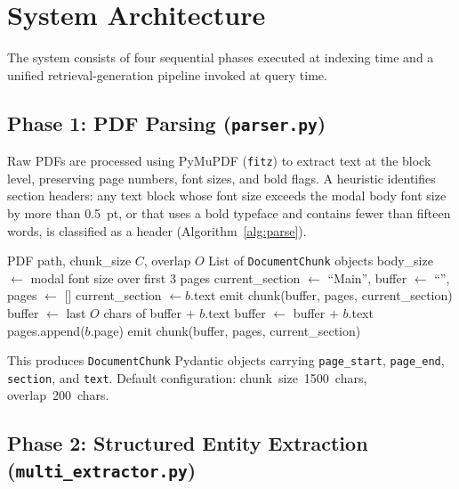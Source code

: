 \documentclass[conference]{IEEEtran}
\begin{document}
\section{System Architecture}
\label{sec:system}

The system consists of four sequential phases executed at indexing time
and a unified retrieval-generation pipeline invoked at query time.

\subsection{Phase 1: PDF Parsing (\texttt{parser.py})}
\label{sec:parsing}

Raw PDFs are processed using PyMuPDF (\texttt{fitz}) to extract text at
the block level, preserving page numbers, font sizes, and bold flags. A
heuristic identifies section headers: any text block whose font size
exceeds the modal body font size by more than 0.5~pt, or that uses a
bold typeface and contains fewer than fifteen words, is classified as a
header (Algorithm~\ref{alg:parse}).

\begin{algorithm}
\caption{Section-Aware Chunking}
\label{alg:parse}
\begin{algorithmic}[1]
\Require PDF path, chunk\_size $C$, overlap $O$
\Ensure List of \texttt{DocumentChunk} objects
\State body\_size $\leftarrow$ modal font size over first 3 pages
\State current\_section $\leftarrow$ ``Main'', buffer $\leftarrow$ ``'', pages $\leftarrow$ []
    \State current\_section $\leftarrow b$.text
  \EndIf
    \State emit chunk(buffer, pages, current\_section)
    \State buffer $\leftarrow$ last $O$ chars of buffer $+$ $b$.text
  \Else
    \State buffer $\leftarrow$ buffer $+$ $b$.text
  \EndIf
  \State pages.append($b$.page)
\EndFor
\State emit chunk(buffer, pages, current\_section)
\end{algorithmic}
\end{algorithm}

This produces \texttt{DocumentChunk} Pydantic objects carrying
\texttt{page\_start}, \texttt{page\_end}, \texttt{section}, and
\texttt{text}. Default configuration: chunk~size~1500~chars,
overlap~200~chars.

\subsection{Phase 2: Structured Entity Extraction (\texttt{multi\_extractor.py})}
\label{sec:extraction}
\end{document}
